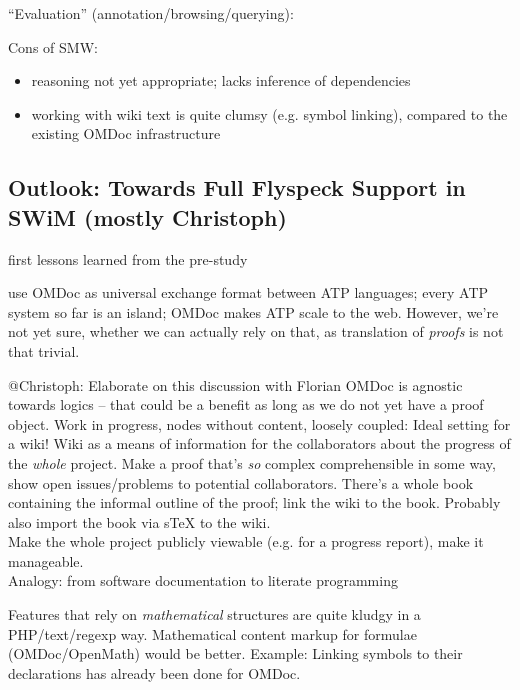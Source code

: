 \documentclass{llncs}
\begin{document}
``Evaluation'' (annotation/browsing/querying):

Cons of SMW:
\begin{itemize}
\item reasoning not yet appropriate; lacks inference of dependencies
\item working with wiki text is quite clumsy (e.g. symbol linking), compared to the
  existing OMDoc infrastructure
\end{itemize}

\subsection{Outlook: Towards Full Flyspeck Support in SWiM (mostly Christoph)}
\label{sec:flyspeck-swim}

first lessons learned from the pre-study

use OMDoc as universal exchange format between ATP languages; every ATP system so far is
an island; OMDoc makes ATP scale to the web.  However, we're not yet sure, whether we can actually rely on that, as translation of \emph{proofs} is not
that trivial.


\begin{todo}{@Christoph: Elaborate on this discussion with Florian}
  OMDoc is agnostic towards logics -- that could be a benefit as long as we do not yet
  have a proof object. Work in progress, nodes without content, loosely coupled: Ideal
  setting for a wiki!  Wiki as a means of information for the collaborators about the
  progress of the \emph{whole} project.  Make a proof that's \emph{so} complex
  comprehensible in some way, show open issues/problems to potential collaborators.
  There's a whole book containing the informal outline of the proof; link the wiki to the
  book.  Probably also import the book via sTeX to the wiki.\\
  Make the whole project publicly viewable (e.g. for a progress report), make it
  manageable.\\
  Analogy: from software documentation to literate programming
\end{todo}

Features that rely on \emph{mathematical} structures are quite kludgy in a PHP/text/regexp
way.  Mathematical content markup for formulae (OMDoc/OpenMath) would be better.  Example:
Linking symbols to their declarations has already been done for OMDoc.
\end{document}

